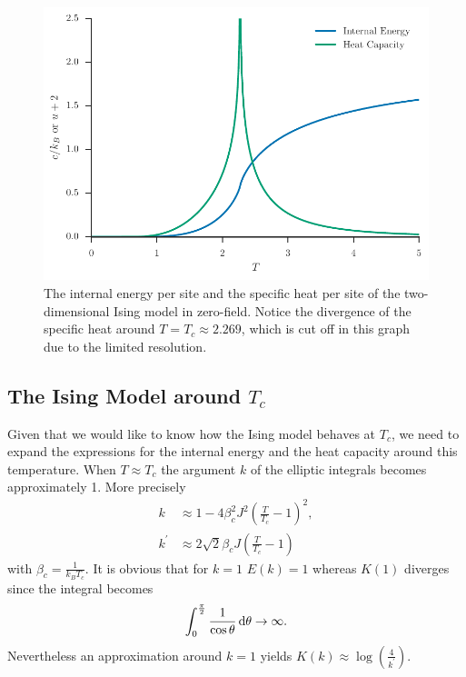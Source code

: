 \documentclass[11pt, a4paper]{report} %
\begin{document}
\begin{figure}[htb]
	\centering
	\includegraphics[width=\linewidth]{ising_internal_energy.pdf}
	\caption{The internal energy per site and the specific heat per site of the two-dimensional Ising model in zero-field. Notice the divergence of the specific heat around \(T=T_c \approx 2.269\), which is cut off in this graph due to the limited resolution.}
	\label{fig:ising_internal_energy}
\end{figure}

\subsection{The Ising Model around \(T_c\)}

Given that we would like to know how the Ising model behaves at \(T_c\), we need to expand the expressions for the internal energy and the heat capacity around this temperature.
When \(T \approx T_c\) the argument \(k\) of the elliptic integrals becomes approximately 1. More precisely
\begin{align}
	k &\approx 1 - 4 \beta_c^2 J^2 (\frac{T}{T_c} - 1)^2, \\
	k^' &\approx 2 \sqrt{2} \beta_c J (\frac{T}{T_c} - 1)
\end{align}
with \(\beta_c = \frac{1}{k_B T_c}\).
It is obvious that for \(k = 1\) \(E(k) = 1\) whereas \(K(1)\) diverges since the integral becomes
\begin{align}
	\int_0^{\frac{\pi}{2}}\frac{1}{\cos{\theta}} \dif \theta \to \infty.
\end{align}
Nevertheless an approximation around \(k = 1\) yields \(K(k) \approx \log(\frac{4}{k^'})\).
\end{document}
